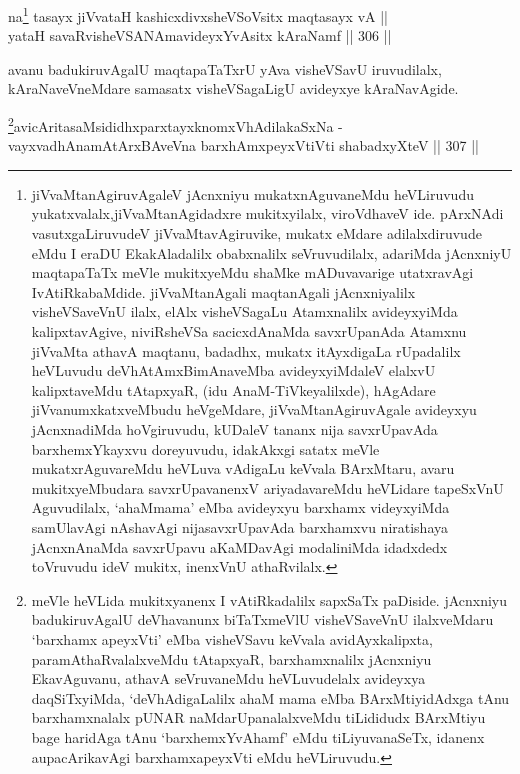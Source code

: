 \begin{shl}
na\footnote{jiVvaMtanAgiruvAgaleV jAcnxniyu mukatxnAguvaneMdu heVLiruvudu yukatxvalalx,\break jiVvaMtanAgidadxre mukitxyilalx, viroVdhaveV ide. pArxNAdi vasutxgaLiruvudeV jiVvaMtavAgiruvike, mukatx eMdare adilalxdiruvude eMdu I eraDU EkakAladalilx obabxnalilx seVruvudilalx, adariMda jAcnxniyU maqtapaTaTx meVle mukitxyeMdu shaMke mADuvavarige utatxravAgi IvAtiRkabaMdide. jiVvaMtanAgali maqtanAgali jAcnxniyalilx visheVSaveVnU ilalx, elAlx visheVSagaLu Atamxnalilx avideyxyiMda kalipxtavAgive, niviRsheVSa sacicxdAnaMda savxrUpanAda Atamxnu jiVvaMta athavA maqtanu, badadhx, mukatx itAyxdigaLa rUpadalilx heVLuvudu deVhAtAmxBimAnaveMba avideyxyiMdaleV elalxvU kalipxtaveMdu tAtapxyaR, (idu AnaM-TiVkeyalilxde), hAgAdare jiVvanumxkatxveMbudu heVgeMdare, jiVvaMtanAgiruvAgale avideyxyu jAcnxnadiMda hoVgiruvudu, kUDaleV tananx nija savxrUpavAda barxhemxYkayxvu doreyuvudu, idakAkxgi satatx meVle mukatxrAguvareMdu heVLuva vAdigaLu keVvala BArxMtaru, avaru mukitxyeMbudara savxrUpavanenxV ariyadavareMdu heVLidare tapeSxVnU Aguvudilalx, `ahaMmama' eMba avideyxyu barxhamx videyxyiMda samUlavAgi nAshavAgi nijasavxrUpavAda barxhamxvu niratishaya jAcnxnAnaMda savxrUpavu aKaMDavAgi modaliniMda idadxdedx toVruvudu ideV mukitx, inenxVnU athaRvilalx.} tasayx jiVvataH kashicxdivxsheVSoV\s sitx maqtasayx vA || \\
yataH savaRvisheVSANAmavideyxYvAsitx kAraNamf \hfill || 306 ||  
\end{shl}

\begin{artha}
avanu badukiruvAgalU maqtapaTaTxrU yAva visheVSavU
iruvudilalx, kAraNaveVneMdare samasatx visheVSagaLigU avideyxye kAraNavAgide.
\end{artha}


\begin{shl}
\footnote{meVle heVLida mukitxyanenx I vAtiRkadalilx sapxSaTx paDiside. jAcnxniyu badukiruvAgalU deVhavanunx biTaTxmeVlU visheVSaveVnU ilalxveMdaru `barxhamx apeyxVti' eMba visheVSavu keVvala avidAyxkalipxta, paramAthaRvalalxveMdu tAtapxyaR, barxhamxnalilx jAcnxniyu EkavAguvanu, athavA seVruvaneMdu heVLuvudelalx avideyxya daqSiTxyiMda, `deVhAdigaLalilx ahaM mama eMba BArxMtiyidAdxga tAnu barxhamxnalalx pUNAR naMdarUpanalalxveMdu tiLididudx BArxMtiyu bage haridAga tAnu `barxhemxYvAhamf' eMdu tiLiyuvanaSeTx, idanenx aupacArikavAgi barxhamxapeyxVti eMdu heVLiruvudu.}avicAritasaMsididhxparxtayxknomxVhAdilakaSxNa - \\
vayxvadhAnamAtArxBAveVna barxhAmxpeyxVtiVti shabadxyXteV \hfill || 307 ||  
\end{shl}

